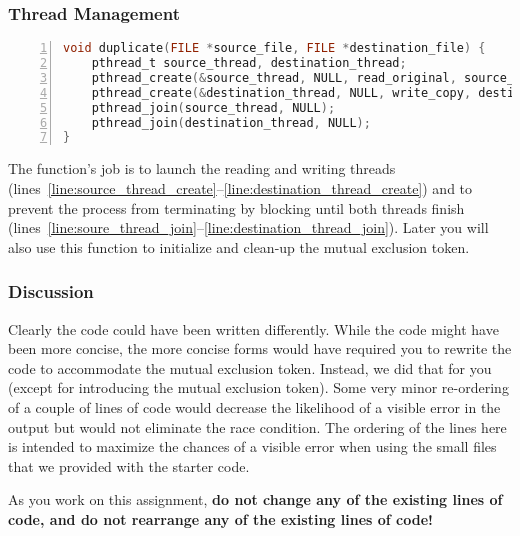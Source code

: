     \subsubsection{Thread Management}

    \renewcommand*\thelstnumber{\roman{lstnumber}}
%    
\begin{lstlisting}[language=c, numbers=left, escapechar=`]
void duplicate(FILE *source_file, FILE *destination_file) {
    pthread_t source_thread, destination_thread;
    pthread_create(&source_thread, NULL, read_original, source_file);           `\label{line:source_thread_create}`
    pthread_create(&destination_thread, NULL, write_copy, destination_file);    `\label{line:destination_thread_create}`
    pthread_join(source_thread, NULL);                                          `\label{line:soure_thread_join}`
    pthread_join(destination_thread, NULL);                                     `\label{line:destination_thread_join}`
}
\end{lstlisting}
    \renewcommand*\thelstnumber{\arabic{lstnumber}}

    The  function's job is to launch the reading and writing threads (lines~\ref{line:source_thread_create}--\ref{line:destination_thread_create}) and to prevent the process from terminating by blocking until both threads finish (lines~\ref{line:soure_thread_join}--\ref{line:destination_thread_join}).
    Later you will also use this function to initialize and clean-up the mutual exclusion token.

    \subsubsection{Discussion}

    Clearly the code could have been written differently.
    While the code might have been more concise, the more concise forms would have required you to rewrite the code to accommodate the mutual exclusion token.
    Instead, we did that for you (except for introducing the mutual exclusion token).
    Some very minor re-ordering of a couple of lines of code would decrease the likelihood of a visible error in the output but would not eliminate the race condition.
    The ordering of the lines here is intended to maximize the chances of a visible error when using the small files that we provided with the starter code.

    As you work on this assignment, \textbf{do not change any of the existing lines of code, and do not rearrange any of the existing lines of code!}

